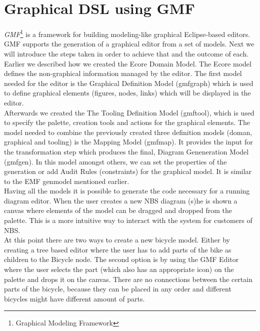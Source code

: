 \section{Graphical DSL using GMF}
\label{sec.gmf}

\noindent \emph{GMF}\footnote{Graphical Modeling Framework} is a framework for
building modeling-like graphical Eclipse-based editors.
\cite{Article_Introducing_GMF} GMF supports the generation of a graphical editor
from a set of models. Next we will introduce the steps taken in order to achieve
that and the outcome of
each.\\

\noindent Earlier we described how we created the Ecore Domain Model. The Ecore
model defines the non-graphical information managed by the editor. The first
model needed for the editor is the Graphical Definition Model (gmfgraph) which
is used to define graphical elements (figures, nodes, links)
which will be displayed in the editor. \\

\noindent Afterwards we created the The Tooling Definition Model (gmftool),
which is used to specify the palette, creation tools and actions for the
graphical elements. The model needed to combine the previously created three
definition models (doman, graphical and tooling) is the Mapping Model (gmfmap).
It provides the input for the transformation step which produces the final,
Diagram Geneneration Model (gmfgen). In this model amongst others, we can set
the properties of the generation or add Audit Rules (constraints) for the
graphical model. It is similar to the EMF genmodel
mentioned earlier. \cite{GMF_Tutorial} \\

\noindent Having all the models it is possible to generate the code necessary
for a running diagram editor. When the user creates a new NBS diagram (s)he is
shown a canvas where elements of the model can be dragged and dropped from the
palette. This is a more intuitive way to interact
with the system for customers of NBS.\\

\noindent At this point there are two ways to create a new bicycle model. Either
by creating a tree based editor where the user has to add parts of the bike as
children to the Bicycle node. The second option is by using the GMF Editor where
the user selects the part (which also has an appropriate icon) on the palette
and drops it on the canvas. There are no connections between the certain parts
of the bicycle, because they can be placed in any order and different bicycles
might
have different amount of parts.\\

